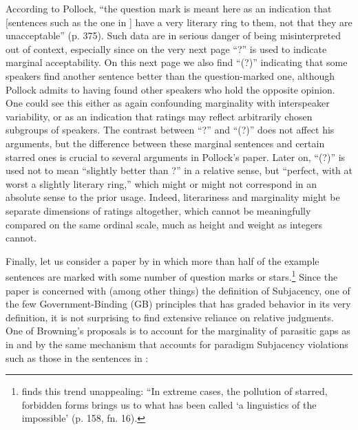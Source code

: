 \noindent According to Pollock, ``the question mark is meant here as an indication that [sentences such as the one in ] have a very literary ring to them, not that they are unacceptable'' (p. 375). Such data are in serious danger of being misinterpreted out of context, especially since on the very next page ``?'' is used to indicate marginal acceptability. On this next page we also find ``(?)'' indicating that some speakers find another sentence better than the question-marked one, although Pollock admits to having found other speakers who hold the opposite opinion. One could see this either as again confounding marginality with interspeaker variability, or as an indication that ratings may reflect arbitrarily chosen subgroups of speakers. The contrast between ``?'' and ``(?)'' does not affect his arguments, but the difference between these marginal sentences and certain starred ones is crucial to several arguments in Pollock's paper. Later on, ``(?)'' is used not to mean ``slightly better than ?'' in a relative sense, but ``perfect, with at worst a slightly literary ring,'' which might or might not correspond in an absolute sense to the prior usage. Indeed, literariness and marginality might be separate dimensions of ratings altogether, which cannot be meaningfully compared on the same  ordinal scale, much as height and weight as integers cannot.

Finally, let us consider a paper by \citet{Browning1987} in which more than half of the example sentences are marked with some number of question marks or stars.\footnote{\citet{Hagege1981} finds this trend unappealing: ``In extreme cases, the pollution of starred, forbidden forms brings us to what has been called `a linguistics of the impossible'{\textquotedbl} (p. 158, fn. 16).}
 Since the paper is concerned with (among other things) the definition of Subjacency, one of the few Government-Binding (GB) principles that has graded
behavior in its very definition, it is not surprising to find extensive reliance on relative judgments. One of Browning's proposals is to account for the marginality of parasitic gaps as in  and  by the same mechanism that accounts for paradigm Subjacency violations such as those in the sentences in :


\label{ex:2:11}
   \z

